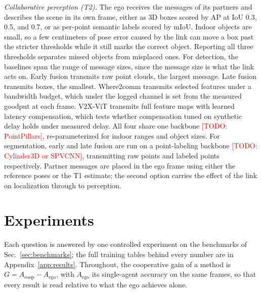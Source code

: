 \documentclass[journal]{IEEEtran}
\newcommand{\todo}[1]{\textcolor{red}{[TODO: #1]}}
\begin{document}


\emph{Collaborative perception (T2).} The ego receives the messages
of its partners and describes the scene in its own frame, either as
3D boxes scored by AP at IoU 0.3, 0.5, and 0.7, or as per-point
semantic labels scored by mIoU. Indoor objects are small, so a few
centimeters of pose error caused by the link can move a box past the
stricter thresholds while it still marks the correct object.
Reporting all three thresholds separates missed objects from
misplaced ones. For detection, the baselines span the range of
message sizes, since the message size is what the link acts on. Early
fusion transmits raw point clouds, the largest message. Late fusion
transmits boxes, the smallest. Where2comm \cite{where2comm} transmits
selected features under a bandwidth budget, which under the logged
channel is set from the measured goodput at each frame. V2X-ViT
\cite{v2xvit} transmits full feature maps with learned latency
compensation, which tests whether compensation tuned on synthetic
delay holds under measured delay. All four share one backbone
\todo{PointPillars}, re-parameterized for indoor ranges and object
sizes. For segmentation, early and late fusion are run on a
point-labeling backbone \todo{Cylinder3D or SPVCNN}, transmitting
raw points and labeled points respectively. Partner messages are
placed in the ego frame using either the reference poses or the T1
estimate; the second option carries the effect of the link on
localization through to perception.

\section{Experiments}
\label{sec:experiments}
Each question is answered by one controlled experiment on the
benchmarks of Sec.~\ref{sec:benchmarks}; the full training tables
behind every number are in Appendix~\ref{app:results}. Throughout, the
cooperative gain of a method is $G = A_{\mathrm{coop}} -
A_{\mathrm{ego}}$, with $A_{\mathrm{ego}}$ its single-agent accuracy
on the same frames, so that every result is read relative to what the
ego achieves alone.
\end{document}
